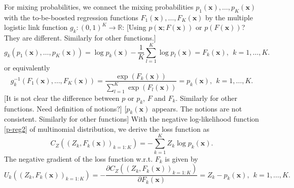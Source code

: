 \documentclass[11pt]{article}
\numberwithin{equation}{section}
\def\R{{\mathbb R}}  %
\def\bx{\boldsymbol{x}}
\begin{document}
For mixing probabilities, we connect the mixing probabilities $p_1(\bx),\ldots,p_K(\bx)$ with the to-be-boosted regression functions $F_1(\bx),\ldots,F_K(\bx)$ by the multiple logistic link function $g_k:(0,1)^K\rightarrow \R$: {\color{blue}[Using $p(\bx;F(\bx))$ or $p(F(\bx))$? They are different. Similarly for other functions.]}	
	\begin{equation}\label{inv-logistic}
		g_k(p_1(\bx),\ldots,p_K(\bx))=\log p_k(\bx)-\frac{1}{K}\sum_{l=1}^K\log p_l(\bx)=F_k(\bx),~~k=1,\ldots,K.
\end{equation}
or equivalently
	\begin{equation}\label{logistic}
	g_k^{-1}(F_1(\bx),\ldots,F_K(\bx))=\frac{\exp\left(F_k(\bx)\right)}{\sum_{l=1}^{K}\exp\left(F_l(\bx)\right)}=	p_k(\bx),~~k=1,\ldots,K.
	\end{equation}
	 {\color{blue}[It is not clear the difference between $p$ or $p_k$, $F$ and $F_k$. Similarly for other functions. Need definition of notions?]}
{\color{blue}[$p_k(\bx)$ appears. The notions are not consistent. Similarly for other functions]}
With the negative log-likelihood function \eqref{p-reg2} of multinomial distribution, we derive the loss function as
\begin{equation}\label{p-loss}
		{C_{Z}\left((Z_k, F_k(\bx))_{k=1:K}\right)}= - \sum_{k=1}^K Z_k \log p_k(\bx).
\end{equation}
The negative gradient of the loss function w.r.t. $F_k$ is given by
\begin{equation}\label{p-gradient}
	{U_k\left((Z_k, F_k(\bx))_{k=1:K}\right)}=-\frac{\partial C_{Z}\left((Z_k, F_k(\bx))_{k=1:K}\right)}{\partial F_k(\bx)}=
	Z_k-p_k(\bx), ~~k=1,\ldots,K.
\end{equation}
\end{document}
